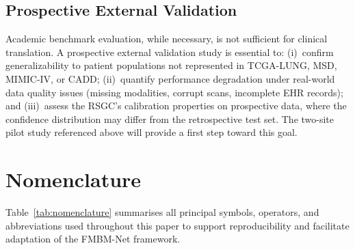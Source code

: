 \documentclass{ieeeaccess}
\begin{document}
\subsection{Prospective External Validation}

Academic benchmark evaluation, while necessary, is not sufficient for clinical
translation. A prospective external validation study is essential to:
(i)~confirm generalizability to patient populations not represented in
TCGA-LUNG, MSD, MIMIC-IV, or CADD; (ii)~quantify performance degradation
under real-world data quality issues (missing modalities, corrupt scans,
incomplete EHR records); and (iii)~assess the RSGC's calibration properties
on prospective data, where the confidence distribution may differ from the
retrospective test set. The two-site pilot study referenced above will
provide a first step toward this goal.

\section{Nomenclature}
\label{sec:nomenclature}

Table~\ref{tab:nomenclature} summarises all principal symbols, operators,
and abbreviations used throughout this paper to support reproducibility and
facilitate adaptation of the FMBM-Net framework.
\end{document}
